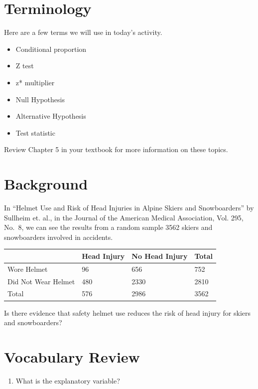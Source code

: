 \documentclass[
]{report}
\providecommand{\tightlist}{%
  \setlength{\itemsep}{0pt}\setlength{\parskip}{0pt}}
\begin{document}
\hypertarget{terminology}{%
\section{Terminology}\label{terminology}}

Here are a few terms we will use in today's activity.

\begin{itemize}
\item
  Conditional proportion
\item
  Z test
\item
  z* multiplier
\item
  Null Hypothesis
\item
  Alternative Hypothesis
\item
  Test statistic
\end{itemize}

Review Chapter 5 in your textbook for more information on these topics.

\hypertarget{background}{%
\section{Background}\label{background}}

In ``Helmet Use and Risk of Head Injuries in Alpine Skiers and Snowboarders'' by Sullheim et. al., in the Journal of the American Medical Association, Vol. 295, No.~8, we can see the results from a random sample 3562 skiers and snowboarders involved in accidents.

\begin{longtable}[]{@{}llll@{}}
\toprule
& Head Injury & No Head Injury & Total\tabularnewline
\midrule
\endhead
Wore Helmet & 96 & 656 & 752\tabularnewline
Did Not Wear Helmet & 480 & 2330 & 2810\tabularnewline
Total & 576 & 2986 & 3562\tabularnewline
\bottomrule
\end{longtable}

Is there evidence that safety helmet use reduces the risk of head injury for skiers and snowboarders?

\hypertarget{vocabulary-review}{%
\section{Vocabulary Review}\label{vocabulary-review}}

\begin{enumerate}
\def\labelenumi{\arabic{enumi}.}
\tightlist
\item
  What is the explanatory variable?
\end{enumerate}
\end{document}
